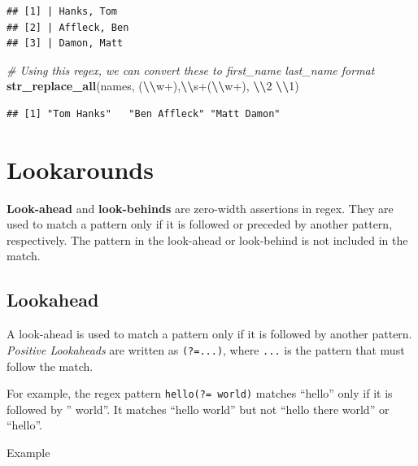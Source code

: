 \documentclass[
]{book}
\newenvironment{Shaded}{\begin{snugshade}}{\end{snugshade}}
\newcommand{\CommentTok}[1]{\textcolor[rgb]{0.56,0.35,0.01}{\textit{#1}}}
\newcommand{\FunctionTok}[1]{\textcolor[rgb]{0.13,0.29,0.53}{\textbf{#1}}}
\newcommand{\NormalTok}[1]{#1}
\newcommand{\SpecialCharTok}[1]{\textcolor[rgb]{0.81,0.36,0.00}{\textbf{#1}}}
\newcommand{\StringTok}[1]{\textcolor[rgb]{0.31,0.60,0.02}{#1}}
\begin{document}
\begin{verbatim}
## [1] | Hanks, Tom
## [2] | Affleck, Ben
## [3] | Damon, Matt
\end{verbatim}

\begin{Shaded}
\begin{Highlighting}[]
\CommentTok{\# Using this regex, we can convert these to first\_name last\_name format}
\FunctionTok{str\_replace\_all}\NormalTok{(names, }\StringTok{\textquotesingle{}(}\SpecialCharTok{\textbackslash{}\textbackslash{}}\StringTok{w+),}\SpecialCharTok{\textbackslash{}\textbackslash{}}\StringTok{s+(}\SpecialCharTok{\textbackslash{}\textbackslash{}}\StringTok{w+)\textquotesingle{}}\NormalTok{, }\StringTok{\textquotesingle{}}\SpecialCharTok{\textbackslash{}\textbackslash{}}\StringTok{2 }\SpecialCharTok{\textbackslash{}\textbackslash{}}\StringTok{1\textquotesingle{}}\NormalTok{)}
\end{Highlighting}
\end{Shaded}

\begin{verbatim}
## [1] "Tom Hanks"   "Ben Affleck" "Matt Damon"
\end{verbatim}

\hypertarget{lookarounds}{%
\section{Lookarounds}\label{lookarounds}}

\textbf{Look-ahead} and \textbf{look-behinds} are zero-width assertions in regex. They are used to match a pattern only if it is followed or preceded by another pattern, respectively. The pattern in the look-ahead or look-behind is not included in the match.

\hypertarget{lookahead}{%
\subsection{Lookahead}\label{lookahead}}

A look-ahead is used to match a pattern only if it is followed by another pattern. \emph{Positive Lookaheads} are written as \texttt{(?=...)}, where \texttt{...} is the pattern that must follow the match.

For example, the regex pattern \texttt{hello(?=\ world)} matches ``hello'' only if it is followed by '' world''. It matches ``hello world'' but not ``hello there world'' or ``hello''.

Example
\end{document}
